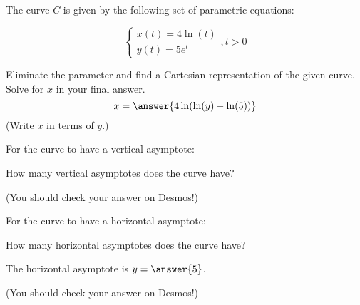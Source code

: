 \documentclass{ximera}
\author{Jim Talamo}
\begin{document}
\begin{exercise}

The curve $C$ is given by the following set of parametric equations:

\[ \begin{cases}
x(t)=   4 \ln (t) \\
y(t)=   5 e^t\end{cases}
, t>0 \]

Eliminate the parameter and find a Cartesian representation of the given curve.  Solve for $x$ in your final answer.
\[
x= \answer{ 4\ln(\ln(y) -\ln(5))}
\]
(Write $x$ in terms of $y$.)

\begin{exercise}
For the curve to have a vertical asymptote:

\begin{multipleChoice}
\end{multipleChoice}

How many vertical asymptotes does the curve have?

\begin{multipleChoice}
\end{multipleChoice} 

(You should check your answer on Desmos!)
\end{exercise}


\begin{exercise}
For the curve to have a horizontal asymptote:

\begin{multipleChoice}
\end{multipleChoice}

How many horizontal asymptotes does the curve have?

\begin{multipleChoice}
\end{multipleChoice} 

The horizontal asymptote is $y=\answer{5}$.

(You should check your answer on Desmos!)
\end{exercise}
\end{exercise}
\end{document}

